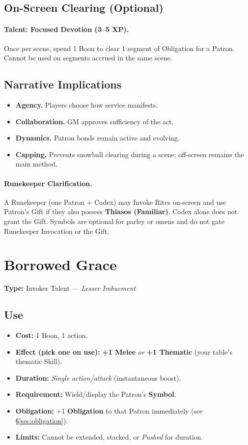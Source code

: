 \subsection*{On-Screen Clearing (Optional)}
\paragraph{Talent: Focused Devotion (3–5 XP).}
Once per scene, spend 1 Boon to clear 1 segment of Obligation for a Patron. Cannot be used on segments accrued in the same scene.

\subsection*{Narrative Implications}
\begin{itemize}
\item \textbf{Agency.} Players choose how service manifests.
\item \textbf{Collaboration.} GM approves sufficiency of the act.
\item \textbf{Dynamics.} Patron bonds remain active and evolving.
\item \textbf{Capping.} Prevents snowball clearing during a scene; off-screen remains the main method.
\end{itemize}

\paragraph{Runekeeper Clarification.}
A Runekeeper (one Patron + Codex) may Invoke Rites on-screen and use Patron's Gift if they also possess \textbf{Thiasos (Familiar)}. Codex alone does not grant the Gift. Symbols are optional for parley or omens and do not gate Runekeeper Invocation or the Gift.

\section*{Borrowed Grace}
\label{talent:borrowed-grace}

\textbf{Type:} Invoker Talent — \textit{Lesser Imbuement}

\subsection*{Use}
\begin{itemize}
  \item \textbf{Cost:} 1 Boon, 1 action.
  \item \textbf{Effect (pick one on use):} \textbf{+1 Melee} \emph{or} \textbf{+1 Thematic} (your table’s thematic Skill).
  \item \textbf{Duration:} \textit{Single action/attack} (instantaneous boost).
  \item \textbf{Requirement:} Wield/display the Patron’s \textbf{Symbol}.
  \item \textbf{Obligation:} +1 \textbf{Obligation} to that Patron immediately (see \S\ref{sec:obligation}).
  \item \textbf{Limits:} Cannot be extended, stacked, or \emph{Pushed} for duration.
\end{itemize}

